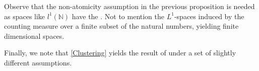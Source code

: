 \documentclass[hidelinks,onefignum,onetabnum]{siamart220329}
\begin{document}
Observe that the  non-atomicity assumption in the previous proposition is needed as spaces like $l^1(\mathbb N)$ have the . Not to mention the $L^1$-spaces induced by the counting measure over a finite subset of the natural numbers, yielding finite dimensional spaces.

Finally,
we note that \cref{Clustering}
yields the result of \cite[Proposition~1]{Visin}
under a set of slightly different assumptions.




\end{document}
